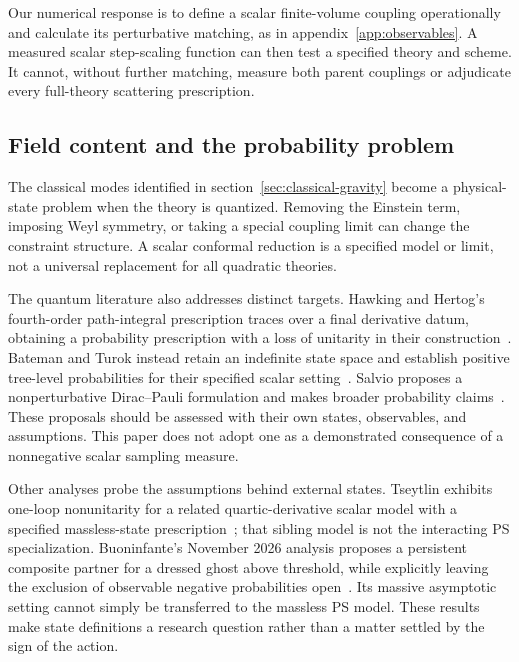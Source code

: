 Our numerical response is to define a scalar finite-volume coupling operationally and calculate its perturbative matching, as in appendix~\ref{app:observables}.  A measured scalar step-scaling function can then test a specified theory and scheme.  It cannot, without further matching, measure both parent couplings or adjudicate every full-theory scattering prescription.

\subsection{Field content and the probability problem}

The classical modes identified in section~\ref{sec:classical-gravity} become a physical-state problem when the theory is quantized.  Removing the Einstein term, imposing Weyl symmetry, or taking a special coupling limit can change the constraint structure.  A scalar conformal reduction is a specified model or limit, not a universal replacement for all quadratic theories.

The quantum literature also addresses distinct targets.  Hawking and Hertog's fourth-order path-integral prescription traces over a final derivative datum, obtaining a probability prescription with a loss of unitarity in their construction~\cite{HawkingHertog:2002}.  Bateman and Turok instead retain an indefinite state space and establish positive tree-level probabilities for their specified scalar setting~\cite{Bateman:2026}.  Salvio proposes a nonperturbative Dirac--Pauli formulation and makes broader probability claims~\cite{Salvio:2024}.  These proposals should be assessed with their own states, observables, and assumptions.  This paper does not adopt one as a demonstrated consequence of a nonnegative scalar sampling measure.

Other analyses probe the assumptions behind external states.  Tseytlin exhibits one-loop nonunitarity for a related quartic-derivative scalar model with a specified massless-state prescription~\cite{Tseytlin:2023}; that sibling model is not the interacting PS specialization.  Buoninfante's November 2026 analysis proposes a persistent composite partner for a dressed ghost above threshold, while explicitly leaving the exclusion of observable negative probabilities open~\cite{Buoninfante:2026Partner}.  Its massive asymptotic setting cannot simply be transferred to the massless PS model.  These results make state definitions a research question rather than a matter settled by the sign of the action.

